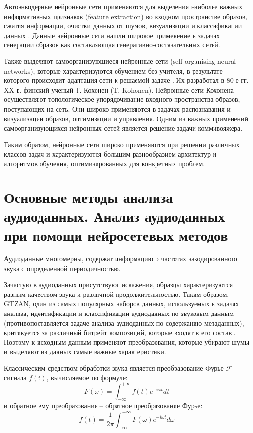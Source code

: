 Автоэнкодерные нейронные сети применяются для выделения наиболее важных информативных признаков 
(feature extraction) во входном пространстве образов, сжатия информации, очистки
данных от шумов, визуализации и классификации данных \cite{bgu_krasn}.
Данные нейронные сети нашли широкое применение в задачах генерации образов как составляющая генеративно-состязательных сетей.

Также выделяют самоорганизующиеся нейронные сети (self-organising neural networks), которые характеризуются обучением без учителя, в результате которого происходит адаптация сети к решаемой задаче . Их разработал в 80-е гг. XX в.
финский ученый Т. Кохонен (T. Kohonen). Нейронные сети
Кохонена осуществляют топологическое упорядочивание входного
пространства образов, поступающих на сеть. Они широко применяются
в задачах распознавания и визуализации образов, оптимизации и
управления. Одним из важных применений самоорганизующихся нейронных сетей является решение задачи коммивояжера.

Таким образом, нейронные сети широко применяются при решении различных классов задач и характеризуются
большим разнообразием архитектур и алгоритмов обучения, оптимизированных для конкретных проблем.

\chapter{Основные методы анализа аудиоданных. Анализ аудиоданных при помощи нейросетевых методов}
Аудиоданные многомерны, содержат информацию о частотах закодированного звука с 
определенной периодичностью. 

Зачастую в аудиоданных присутствуют искажения, образцы характеризуются разным качеством звука и различной продолжительностью. 
Таким образом, GTZAN, один из самых популярных наборов данных, используемых в задачах анализа, идентификации и классификации аудиоданных по
звуковым данным (противопоставляется задаче анализа аудиоданных по содержанию метаданных), критикуется за различный битрейт композиций, которые входят в его состав \cite{gtzan}.
Поэтому к исходным данным применяют преобразования, которые убирают шумы и выделяют из данных самые важные характеристики.

Классическим средством обработки звука является преобразование Фурье $\mathcal{F}$ сигнала $f(t)$, вычисляемое по формуле:
\begin{equation} \label{eq:ft}
	F(\omega) = \int_{-\infty}^{+\infty} f(t) e ^ {-i \omega t} dt
\end{equation} и обратное ему преобразование -- обратное преобразование Фурье:
\begin{equation}
	f(t) = \frac{1}{2\pi} \int_{-\infty}^{+\infty} F(\omega) e^{-i \omega t} d\omega
\end{equation}

